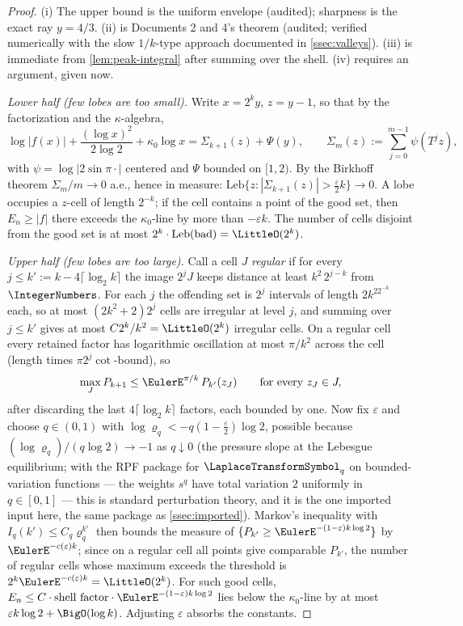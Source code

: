 \documentclass[11pt,oneside]{article}
\theoremstyle{definition}
\theoremstyle{remark}
\newcommand{\T}{T}
\begin{document}
\begin{proof}
(i) The upper bound is the uniform envelope (audited); sharpness is the
exact ray $y=4/3$.  (ii) is Documents 2 and 4's theorem (audited;
verified numerically with the slow $1/k$-type approach documented in
\cref{ssec:valleys}).  (iii) is immediate from \cref{lem:peak-integral}
after summing over the shell.  (iv) requires an argument, given now.

\emph{Lower half (few lobes are too small).}  Write $x=2^ky$,
$z=y-1$, so that by the factorization and the $\kappa$-algebra,
\[
 \log|f(x)|+\frac{(\log x)^2}{2\log2}+\kappa_0\log x
 =\Sigma_{k+1}(z)+\Psi(y),
 \qquad
 \Sigma_m(z):=\sum_{j=0}^{m-1}\psi(\T^jz),
\]
with $\psi=\log|2\sin\pi\cdot|$ centered and $\Psi$ bounded on
$[1,2)$.  By the Birkhoff theorem $\Sigma_m/m\to0$ a.e., hence in
measure: $\mathrm{Leb}\{z:|\Sigma_{k+1}(z)|>\tfrac\varepsilon2k\}\to0$.
A lobe occupies a $z$-cell of length $2^{-k}$; if the cell contains a
point of the good set, then $E_n\ge|f|$ there exceeds the
$\kappa_0$-line by more than $-\varepsilon k$.  The number of cells
disjoint from the good set is at most $2^k\cdot\mathrm{Leb}(\text{bad})
=\LittleO(2^k)$.

\emph{Upper half (few lobes are too large).}  Call a cell $J$
\emph{regular} if for every $j\le k':=k-4\lceil\log_2k\rceil$ the image
$2^jJ$ keeps distance at least $k^2\,2^{j-k}$ from $\IntegerNumbers$.  For each $j$
the offending set is $2^j$ intervals of length $2k^22^{-k}$ each, so at
most $(2k^2+2)2^j$ cells are irregular at level $j$, and summing over
$j\le k'$ gives at most $C2^k/k^2=\LittleO(2^k)$ irregular cells.  On a
regular cell every retained factor has logarithmic oscillation at most
$\pi/k^2$ across the cell (length times $\pi2^j\cot$-bound), so
\[
 \max_{J}P_{k+1}\le\EulerE^{\pi/k}\,P_{k'}(z_J)
 \qquad\text{for every } z_J\in J,
\]
after discarding the last $4\lceil\log_2k\rceil$ factors, each bounded by
one.  Now fix $\varepsilon$ and choose $q\in(0,1)$ with
$\log\varrho_q<-q(1-\tfrac\varepsilon2)\log2$, possible because
$(\log\varrho_q)/(q\log2)\to-1$ as $q\downarrow0$ (the pressure slope at
the Lebesgue equilibrium; with the RPF package for $\LaplaceTransformSymbol_q$ on
bounded-variation functions --- the weights $s^q$ have total variation
$2$ uniformly in $q\in[0,1]$ --- this is standard perturbation theory,
and it is the one imported input here, the same package as
\cref{ssec:imported}).  Markov's inequality with
$I_q(k')\le C_q\varrho_q^{k'}$ then bounds the measure of
$\{P_{k'}\ge\EulerE^{-(1-\varepsilon)k\log2}\}$ by $\EulerE^{-c(\varepsilon)k}$;
since on a regular cell all points give comparable $P_{k'}$, the number
of regular cells whose maximum exceeds the threshold is
$2^k\EulerE^{-c(\varepsilon)k}=\LittleO(2^k)$.  For such good cells,
$E_n\le C\cdot\text{shell factor}\cdot\EulerE^{-(1-\varepsilon)k\log2}$ lies
below the $\kappa_0$-line by at most $\varepsilon k\log 2+\BigO(\log k)$.
Adjusting $\varepsilon$ absorbs the constants.
\end{proof}
\end{document}
